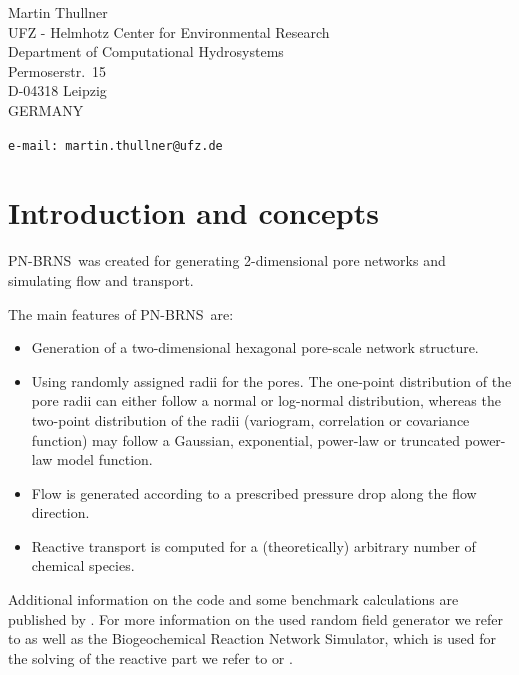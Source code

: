 \documentclass[12pt]{report}
\def\QI{{\sc PN-BRNS}}
\begin{document}
\vskip10mm

Martin Thullner\\
UFZ - Helmhotz Center for Environmental Research\\
Department of Computational Hydrosystems\\
Permoserstr.~15\\
D-04318 Leipzig\\
GERMANY

{\bigskip\small\par
\tt e-mail: martin.thullner@ufz.de\\
}



\endgroup\break

% 


\setcounter{page}{1}\pagestyle{plain}


\chapter{Introduction and concepts}

\QI\ was created for generating 2-dimensional pore networks and simulating flow and transport. 

\bigskip

The main features of \QI\ are:

\begin{itemize}
  \item Generation of a two-dimensional hexagonal pore-scale network structure.
  \item Using randomly assigned radii for the pores. The one-point distribution of the pore radii can either follow a normal or log-normal distribution, whereas the two-point distribution of the radii (variogram, correlation or covariance function) may follow a Gaussian, exponential, power-law or truncated power-law model function. 
  \item Flow is generated according to a prescribed pressure drop along the flow direction. 
  \item Reactive transport is computed for a (theoretically) arbitrary number of chemical species.
\end{itemize}

Additional information on the code and some benchmark calculations are published by \citet{Gharasoo2012}. For more information on the used random field generator we refer to \citep{Kramer2007} as well as the Biogeochemical Reaction Network Simulator, which is used for the solving of the reactive part we refer to \citet{Regnier2002} or \citet{Centler2010}.
\end{document}
